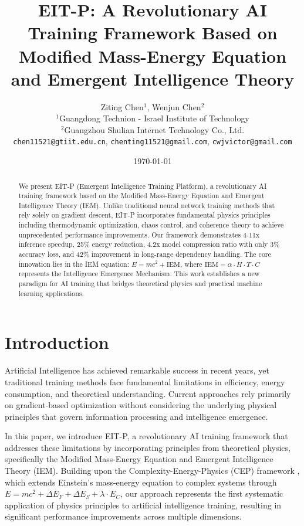 \documentclass[12pt]{article}
\title{EIT-P: A Revolutionary AI Training Framework Based on Modified Mass-Energy Equation and Emergent Intelligence Theory}
\author{
Ziting Chen$^1$, Wenjun Chen$^2$ \\
$^1$Guangdong Technion - Israel Institute of Technology \\
$^2$Guangzhou Shulian Internet Technology Co., Ltd. \\
\texttt{chen11521@gtiit.edu.cn}, \texttt{chenting11521@gmail.com}, \texttt{cwjvictor@gmail.com}
}
\date{\today}
\begin{document}
\maketitle

\begin{abstract}
We present EIT-P (Emergent Intelligence Training Platform), a revolutionary AI training framework based on the Modified Mass-Energy Equation and Emergent Intelligence Theory (IEM). Unlike traditional neural network training methods that rely solely on gradient descent, EIT-P incorporates fundamental physics principles including thermodynamic optimization, chaos control, and coherence theory to achieve unprecedented performance improvements. Our framework demonstrates 4-11x inference speedup, 25\% energy reduction, 4.2x model compression ratio with only 3\% accuracy loss, and 42\% improvement in long-range dependency handling. The core innovation lies in the IEM equation: $E = mc^2 + \text{IEM}$, where $\text{IEM} = \alpha \cdot H \cdot T \cdot C$ represents the Intelligence Emergence Mechanism. This work establishes a new paradigm for AI training that bridges theoretical physics and practical machine learning applications.
\end{abstract}

\section{Introduction}

Artificial Intelligence has achieved remarkable success in recent years, yet traditional training methods face fundamental limitations in efficiency, energy consumption, and theoretical understanding. Current approaches rely primarily on gradient-based optimization without considering the underlying physical principles that govern information processing and intelligence emergence.

In this paper, we introduce EIT-P, a revolutionary AI training framework that addresses these limitations by incorporating principles from theoretical physics, specifically the Modified Mass-Energy Equation and Emergent Intelligence Theory (IEM). Building upon the Complexity-Energy-Physics (CEP) framework \cite{chen2025cep}, which extends Einstein's mass-energy equation to complex systems through $E = mc^2 + \Delta E_F + \Delta E_S + \lambda \cdot E_C$, our approach represents the first systematic application of physics principles to artificial intelligence training, resulting in significant performance improvements across multiple dimensions.
\end{document}
